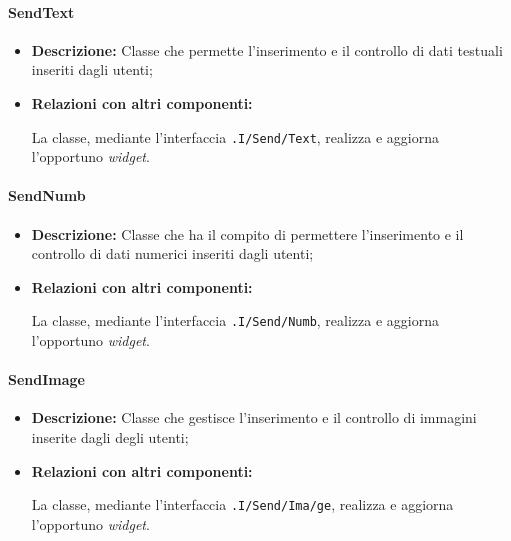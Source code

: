 \paragraph{SendText}
\label{sendText}
\begin{flushleft}
\begin{itemize}
\item \textbf{Descrizione:} Classe che permette l'inserimento e il controllo di dati testuali inseriti dagli utenti;
\item \textbf{Relazioni con altri componenti:}
\begin{sloppypar}
La classe, mediante l'interfaccia \texttt{\viewUser{}.I\fshyp{}Send\fshyp{}Text}, realizza e aggiorna l'opportuno \textit{widget}.
\end{sloppypar}
\end{itemize}
\end{flushleft}

\paragraph{SendNumb}
\label{sendNumb}
\begin{flushleft}
\begin{itemize}
\item \textbf{Descrizione:} Classe che ha il compito di permettere l'inserimento e il controllo di dati numerici inseriti dagli utenti;
\item \textbf{Relazioni con altri componenti:}
\begin{sloppypar}
La classe, mediante l'interfaccia \texttt{\viewUser{}.I\fshyp{}Send\fshyp{}Numb}, realizza e aggiorna l'opportuno \textit{widget}.
\end{sloppypar}
\end{itemize}
\end{flushleft}

\paragraph{SendImage}
\label{sendImage}
\begin{flushleft}
\begin{itemize}
\item \textbf{Descrizione:} Classe che gestisce l'inserimento e il controllo di immagini inserite dagli degli utenti;
\item \textbf{Relazioni con altri componenti:}
\begin{sloppypar}
La classe, mediante l'interfaccia \texttt{\viewUser{}.I\fshyp{}Send\fshyp{}Ima\fshyp{}ge}, realizza e aggiorna l'opportuno \textit{widget}.
\end{sloppypar}
\end{itemize}
\end{flushleft}

